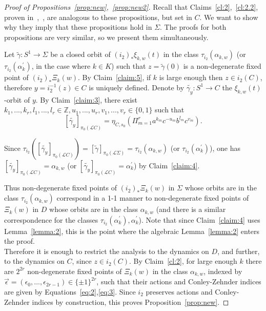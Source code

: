 \documentclass[11pt]{article}
\newcommand{\Z}{\mathbb{Z}}
\begin{document}
            \begin{proof}[Proof of Propositions~\ref{prop:new},~\ref{prop:new2}]
                Recall that Claims~\ref{cl:2},~\ref{cl:2.2}, proven in~\cite{10},~\cite{PS14}, are analogous to these propositions, but set in $C$. We want to show why they imply that these propositions hold in $\Sigma$. The proofs for both propositions are very similar, so we present them simultaneously.
                
                Let $\tilde{\gamma}: S^1 \to \Sigma$ be a closed orbit of $(i_2)_* \xi_{k,w}(t)$ in the class $\tau_{i_2}(\alpha_{k,w})$ (or $\tau_{i_2}(\alpha_k^\prime)$, in the case where $k \in K$) such that $z = \tilde{\gamma}(0)$ is a non-degenerate fixed point of $(i_2)_* \Xi_k(w)$. By Claim~\ref{claim:5}, if $k$ is large enough then $z \in i_2(C)$, therefore $y = i_2^{-1}(z) \in C$ is uniquely defined. Denote by $\tilde{\gamma_y} : S^1 \to C$ the $\xi_{k,w}(t)$-orbit of $y$. By Claim~\ref{claim:3}, there exist $k_1,...,k_r, l_1,...,l_r \in \Z , u_1,...,u_r, v_1,...,v_r \in \{0,1\}$ such that
                \[
                    [\tilde{\gamma_y}]_{\pi_0(\mathscr{L}C)} = \eta_{C,s_0}(\Pi_{m=1}^r a^{k_m}c^{-u_m}b^{l_m}c^{v_m}) .
                \]
                
                Since $\tau_{i_2}([\tilde{\gamma_y}]_{\pi_0(\mathscr{L}C)}) = [\tilde{\gamma}]_{\pi_0(\mathscr{L}\Sigma)} = \tau_{i_2}(\alpha_{k,w})$ (or $\tau_{i_2}(\alpha_k^\prime)$), one has $[\tilde{\gamma_y}]_{\pi_0(\mathscr{L}C)} = \alpha_{k,w}$ (or $[\tilde{\gamma_y}]_{\pi_0(\mathscr{L}C)} = \alpha_k^\prime$) by Claim~\ref{claim:4}.
                
                Thus non-degenerate fixed points of $(i_2)_* \Xi_k(w)$ in $\Sigma$ whose orbits are in the class $\tau_{i_2}(\alpha_{k,w})$ correspond in a 1-1 manner to non-degenerate fixed points of $\Xi_k(w)$ in $D$ whose orbits are in the class $\alpha_{k,w}$ (and there is a similar correspondence for the classes $\tau_{i_2}(\alpha_k^\prime),\alpha_k^\prime$). Note that since Claim~\ref{claim:4} uses Lemma~\ref{lemma:2}, this is the point where the algebraic Lemma~\ref{lemma:2} enters the proof. \\
                
                Therefore it is enough to restrict the analysis to the dynamics on $D$, and further, to the dynamics on $C$, since $z \in i_2(C)$. By Claim~\ref{cl:2}, for large enough $k$ there are $2^{2r}$ non-degenerate fixed points of $\Xi_k(w)$ in the class $\alpha_{k,w}$, indexed by $\vec{\epsilon} = (\epsilon_0,...,\epsilon_{2r-1}) \in \{\pm 1\}^{2r}$, such that their actions and Conley-Zehnder indices are given by Equations~\ref{eq:2},\ref{eq:3}. Since $i_2$ preserves actions and Conley-Zehnder indices by construction, this proves Proposition~\ref{prop:new}.
                

\end{proof}
\end{document}
